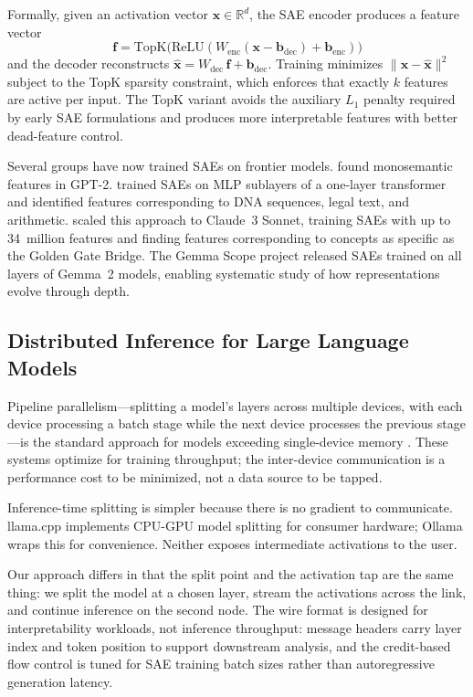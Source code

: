 \documentclass[11pt]{article}
\begin{document}
Formally, given an activation vector $\mathbf{x} \in \mathbb{R}^{d}$, the SAE encoder produces a feature vector
\begin{equation}
  \mathbf{f} = \mathrm{TopK}\bigl(\mathrm{ReLU}(W_{\mathrm{enc}}(\mathbf{x} - \mathbf{b}_{\mathrm{dec}}) + \mathbf{b}_{\mathrm{enc}})\bigr)
\end{equation}
and the decoder reconstructs $\hat{\mathbf{x}} = W_{\mathrm{dec}}\,\mathbf{f} + \mathbf{b}_{\mathrm{dec}}$. Training minimizes $\|\mathbf{x} - \hat{\mathbf{x}}\|^2$ subject to the TopK sparsity constraint, which enforces that exactly $k$ features are active per input. The TopK variant \citep{gao2024scaling} avoids the auxiliary $L_1$ penalty required by early SAE formulations and produces more interpretable features with better dead-feature control.

Several groups have now trained SAEs on frontier models. \citet{cunningham2023sparse} found monosemantic features in GPT-2. \citet{bricken2023monosemanticity} trained SAEs on MLP sublayers of a one-layer transformer and identified features corresponding to DNA sequences, legal text, and arithmetic. \citet{templeton2024scaling} scaled this approach to Claude~3 Sonnet, training SAEs with up to 34~million features and finding features corresponding to concepts as specific as the Golden Gate Bridge. The Gemma Scope project \citep{lieberum2024gemmascope} released SAEs trained on all layers of Gemma~2 models, enabling systematic study of how representations evolve through depth.

\subsection{Distributed Inference for Large Language Models}

Pipeline parallelism---splitting a model's layers across multiple devices, with each device processing a batch stage while the next device processes the previous stage---is the standard approach for models exceeding single-device memory \citep{huang2019gpipe, narayanan2019pipedream}. These systems optimize for training throughput; the inter-device communication is a performance cost to be minimized, not a data source to be tapped.

Inference-time splitting is simpler because there is no gradient to communicate. llama.cpp implements CPU-GPU model splitting for consumer hardware; Ollama wraps this for convenience. Neither exposes intermediate activations to the user.

Our approach differs in that the split point and the activation tap are the same thing: we split the model at a chosen layer, stream the activations across the link, and continue inference on the second node. The wire format is designed for interpretability workloads, not inference throughput: message headers carry layer index and token position to support downstream analysis, and the credit-based flow control is tuned for SAE training batch sizes rather than autoregressive generation latency.
\end{document}
